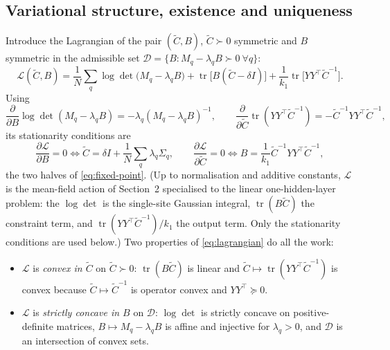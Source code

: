 \documentclass[11pt,a4paper]{article}
\newcommand{\tr}{\operatorname{tr}}
\newcommand{\Ct}{\tilde C}
\newcommand{\dom}{\mathcal D}
\begin{document}
\subsection{Variational structure, existence and uniqueness}
\label{sec:variational}
Introduce the Lagrangian of the pair $(\Ct, B)$, $\Ct \succ 0$ symmetric and $B$ symmetric in the admissible set $\dom = \{B : M_q - \lambda_q B \succ 0\ \forall q\}$:
\begin{equation}
  \mathcal L(\Ct, B) = \frac1N\sum_q \log\det\big(M_q - \lambda_q B\big) + \tr\big[B(\Ct - \delta I)\big] + \frac{1}{k_1}\tr\big[YY^\top \Ct^{-1}\big].
  \label{eq:lagrangian}
\end{equation}
Using
\begin{equation}
  \frac{\partial}{\partial B}\log\det(M_q - \lambda_q B) = -\lambda_q(M_q-\lambda_q B)^{-1},
  \qquad
  \frac{\partial}{\partial\Ct}\tr(YY^\top\Ct^{-1}) = -\Ct^{-1}YY^\top\Ct^{-1},
\end{equation}
its stationarity conditions are
\begin{equation}
  \frac{\partial\mathcal L}{\partial B} = 0 \iff \Ct = \delta I + \frac1N\sum_q\lambda_q\Sigma_q,
  \qquad
  \frac{\partial\mathcal L}{\partial \Ct} = 0 \iff B = \frac1{k_1}\Ct^{-1}YY^\top\Ct^{-1},
\end{equation}
the two halves of \eqref{eq:fixed-point}. (Up to normalisation and additive constants, $\mathcal L$ is the mean-field action of Section~2 specialised to the linear one-hidden-layer problem: the $\log\det$ is the single-site Gaussian integral, $\tr(B\Ct)$ the constraint term, and $\tr(YY^\top\Ct^{-1})/k_1$ the output term. Only the stationarity conditions are used below.) Two properties of \eqref{eq:lagrangian} do all the work:
\begin{itemize}
  \item $\mathcal L$ is \emph{convex in $\Ct$} on $\Ct \succ 0$: $\tr(B\Ct)$ is linear and $\Ct \mapsto \tr(YY^\top\Ct^{-1})$ is convex because $\Ct\mapsto\Ct^{-1}$ is operator convex and $YY^\top \succeq 0$.
  \item $\mathcal L$ is \emph{strictly concave in $B$} on $\dom$: $\log\det$ is strictly concave on positive-definite matrices, $B \mapsto M_q - \lambda_q B$ is affine and injective for $\lambda_q > 0$, and $\dom$ is an intersection of convex sets.
\end{itemize}
\end{document}
